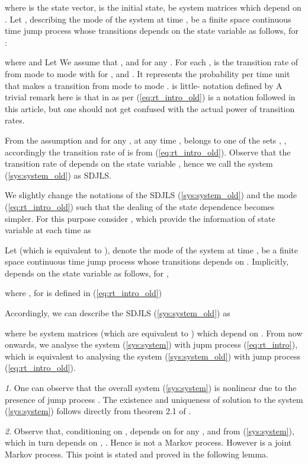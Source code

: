 \documentclass[10.5pt,a4paper]{article}
\theoremstyle{remark}
\theoremstyle{plain}
\theoremstyle{plain}
\theoremstyle{remark}
\newtheorem{rem}{\protect\remarkname}
\theoremstyle{plain}
\theoremstyle{plain}
\providecommand{\remarkname}{Remark}
\begin{document}
where  is the state vector, 
is the initial state,  be
system matrices which depend on . Let ,
describing the mode of the system at time , be a finite space
continuous time jump process whose transitions depends on the state
variable  as follows, for  : 

where  and 
Let  We assume that ,
 and 
for any . For each , 
is the transition rate of  from mode  to mode 
with  for , and .
It represents the probability per time unit that  makes
a transition from mode  to mode .  is little- notation
defined by  A trivial
remark here is that  in  as per (\ref{eq:rt_intro_old}) is a
notation followed in this article, but one should not get confused with the actual power of transition rates.

From the assumption 
and  for any , at any
time ,  belongs to one of the sets , ,
accordingly the transition rate of  is from
(\ref{eq:rt_intro_old}). Observe that the transition rate of 
depends on the state variable , hence we call the system (\ref{sys:system_old})
as SDJLS.

We slightly change the notations of the SDJLS (\ref{sys:system_old})
and the mode  (\ref{eq:rt_intro_old}) such that the dealing
of the state dependence becomes simpler. For this purpose consider
, which provide the information of state
variable  at each time  as



Let  (which is equivalent to ),
denote the mode of the system at time , be a finite space continuous
time jump process whose transitions depends on . Implicitly, 
 depends on the state variable  as follows, for ,

where , for  is defined in (\ref{eq:rt_intro_old})

Accordingly, we can describe the SDJLS (\ref{sys:system_old}) as

where  be system matrices
(which are equivalent to ) which depend on .
From now onwards, we analyse the system (\ref{sys:system}) with jupm
process (\ref{eq:rt_intro}), which is equivalent to analysing the
system (\ref{sys:system_old}) with jump process (\ref{eq:rt_intro_old}).
\begin{rem}
\label{remark:existence} One can observe that the overall system
(\ref{sys:system}) is nonlinear due to the presence of jump process
. The existence and uniqueness of solution to the
system (\ref{sys:system}) follows directly from theorem 2.1 of \cite{yin2009hybrid}.
\end{rem}
\begin{rem}Observe that, conditioning on , 
depends on  for any , and from (\ref{sys:system}), which
in turn depends on , . Hence 
is not a Markov process. However 
is a joint Markov process. This point is stated and proved in the
following lemma. \end{rem}
\end{document}
